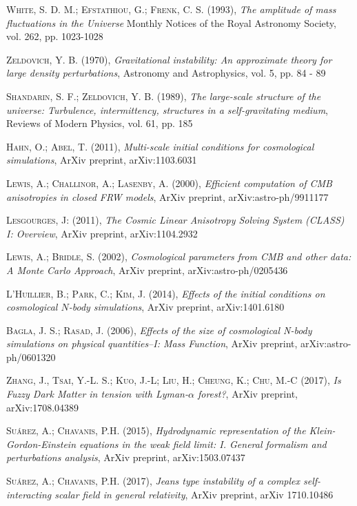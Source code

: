 \documentclass[a4paper,openright,12pt]{book}
\begin{document}
\begin{thebibliography}{a}
 \textsc{White, S. D. M.; Efstathiou, G.; Frenk, C. S. (1993)},
\textit{The amplitude of mass fluctuations in the Universe}
Monthly Notices of the Royal Astronomy Society, vol. 262, pp. 1023-1028

 \textsc{Zeldovich, Y. B. (1970)},
\textit{Gravitational instability: An approximate theory for large density perturbations},
Astronomy and Astrophysics, vol. 5, pp. 84 - 89

 \textsc{Shandarin, S. F.; Zeldovich, Y. B. (1989)},
\textit{The large-scale structure of the universe: Turbulence, intermittency, structures in a self-gravitating medium},
Reviews of Modern Physics, vol. 61, pp. 185

 \textsc{Hahn, O.; Abel, T. (2011)},
\textit{Multi-scale initial conditions for cosmological simulations},
ArXiv preprint, arXiv:1103.6031

 \textsc{Lewis, A.; Challinor, A.; Lasenby, A. (2000)},
\textit{Efficient computation of CMB anisotropies in closed FRW models},
ArXiv preprint, arXiv:astro-ph/9911177

 \textsc{Lesgourges, J: (2011)}, 
\textit{The Cosmic Linear Anisotropy Solving System (CLASS) I: Overview},
ArXiv preprint, arXiv:1104.2932

 \textsc{Lewis, A.; Bridle, S. (2002)},
\textit{Cosmological parameters from CMB and other data: A Monte Carlo Approach},
ArXiv preprint, arXiv:astro-ph/0205436

 \textsc{L'Huillier, B.; Park, C.; Kim, J. (2014)},
\textit{Effects of the initial conditions on cosmological $N$-body simulations},
ArXiv preprint, arXiv:1401.6180

 \textsc{Bagla, J. S.; Rasad, J. (2006)},
\textit{Effects of the size of cosmological N-body simulations on physical quantities--I: Mass Function},
ArXiv preprint, arXiv:astro-ph/0601320

 \textsc{Zhang, J., Tsai, Y.-L. S.; Kuo, J.-L; Liu, H.; Cheung, K.; Chu, M.-C (2017)},
\textit{Is Fuzzy Dark Matter in tension with Lyman-$\alpha$ forest?},
ArXiv preprint, arXiv:1708.04389

 \textsc{Suárez, A.; Chavanis, P.H. (2015)},
\textit{Hydrodynamic representation of the Klein-Gordon-Einstein equations
in the weak field limit:  I. General formalism and perturbations analysis},
ArXiv preprint, arXiv:1503.07437

 \textsc{Suárez, A.; Chavanis, P.H. (2017)},
\textit{Jeans type instability of a complex self-interacting scalar field in general relativity},
ArXiv preprint, arXiv 1710.10486



\end{thebibliography}
\end{document}
